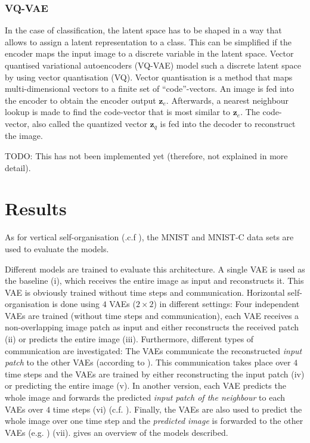\subsubsection{VQ-VAE}
In the case of classification, the latent space has to be shaped in a way that allows to assign a latent representation to a class.
This can be simplified if the encoder maps the input image to a discrete variable in the latent space.
Vector quantised variational autoencoders (VQ-VAE)  model such a discrete latent space by using vector quantisation (VQ).
Vector quantisation is a method that maps multi-dimensional vectors to a finite set of ``code''-vectors.
An image is fed into the encoder to obtain the encoder output $\boldsymbol{z}_e$.
Afterwards, a nearest neighbour lookup is made to find the code-vector that is most similar to $\boldsymbol{z}_e$.
The code-vector, also called the quantized vector $\boldsymbol{z}_q$ is fed into the decoder to reconstruct the image.


TODO: This has not been implemented yet (therefore, not explained in more detail).



\section{Results}
As for vertical self-organisation (.c.f ), the MNIST \cite{Lecun_Bottou_Bengio_Haffner_1998} and MNIST-C  data sets are used to evaluate the models. 

Different models are trained to evaluate this architecture. A single VAE is used as the baseline (i), which receives the entire image as input and reconstructs it. This VAE is obviously trained without time steps and communication. Horizontal self-organisation is done using $4$ VAEs ($2\times 2$) in different settings: Four independent VAEs are trained (without time steps and communication), each VAE receives a non-overlapping image patch as input and either reconstructs the received patch (ii) or predicts the entire image (iii). Furthermore, different types of communication are investigated: The VAEs communicate the reconstructed \emph{input patch} to the other VAEs (according to ). This communication takes place over $4$ time steps and the VAEs are trained by either reconstructing the input patch (iv) or predicting the entire image (v). In another version, each VAE predicts the whole image and forwards the predicted \emph{input patch of the neighbour} to each VAEs over $4$ time steps  (vi) (c.f. ). Finally, the VAEs are also used to predict the whole image over one time step and the \emph{predicted image} is forwarded to the other VAEs (e.g. ) (vii).  gives an overview of the models described.


